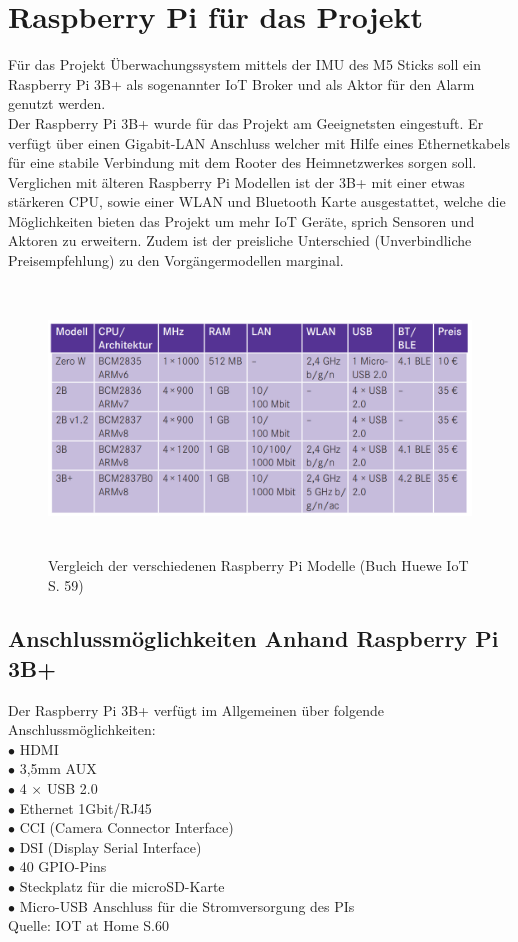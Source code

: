 \documentclass[12pt,a4paper,openany]{scrbook}
\begin{document}
\chapter{Raspberry Pi für das Projekt}
Für das Projekt Überwachungssystem mittels der IMU des M5 Sticks soll ein\\ 
Raspberry Pi 3B+ als sogenannter IoT Broker und als Aktor für den Alarm genutzt werden.\\
Der Raspberry Pi 3B+ wurde für das Projekt am Geeignetsten eingestuft. Er verfügt über einen Gigabit-LAN Anschluss welcher mit Hilfe eines Ethernetkabels für eine stabile Verbindung mit dem Rooter des Heimnetzwerkes sorgen soll. Verglichen mit älteren Raspberry Pi Modellen ist der 3B+ mit einer etwas stärkeren CPU, sowie einer WLAN und Bluetooth Karte ausgestattet, welche die Möglichkeiten bieten das Projekt um mehr IoT Geräte, sprich Sensoren und Aktoren zu erweitern. Zudem ist der preisliche Unterschied (Unverbindliche Preisempfehlung) zu den Vorgängermodellen marginal.  

	\begin{figure}[!h]
	\centering
	\includegraphics[height=200pt]{img/tabelle_pi_vergleich}
	\caption{Vergleich der verschiedenen Raspberry Pi Modelle (Buch Huewe IoT S. 59)}
	\label{Bildlabel}
\end{figure}


\section{Anschlussmöglichkeiten Anhand Raspberry Pi 3B+}
Der Raspberry Pi 3B+ verfügt im Allgemeinen über folgende Anschlussmöglichkeiten:\\[3mm] 
$\bullet$ HDMI   \\ %
$\bullet$ 3,5mm AUX\\ 
$\bullet$ 4 $\times$ USB 2.0 \\ 
$\bullet$ Ethernet 1Gbit/RJ45\\ 
$\bullet$ CCI (Camera Connector Interface)\\ 
$\bullet$  DSI (Display Serial Interface)\\
$\bullet$ 40 GPIO-Pins\\
$\bullet$ Steckplatz für die microSD-Karte\\
$\bullet$ Micro-USB Anschluss für die Stromversorgung des PIs\\
Quelle: IOT at Home S.60\\ [10mm]
\end{document}
